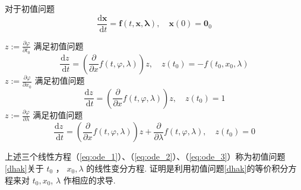 对于初值问题
\begin{equation}\label{dhak}
    \frac{\mathrm{d} \boldsymbol{x}}{\mathrm{~d} t}=\boldsymbol{f}(t, \boldsymbol{x}, \boldsymbol{\lambda}), \quad \boldsymbol{x}\left(0\right)=\boldsymbol{0}_0
\end{equation}
\begin{corollary}
    $z:=\frac{\partial \varphi}{\partial t_0}$ 满足初值问题
    \begin{equation}\label{eq:ode_1}
        \frac{\mathrm{d} z}{\mathrm{~d} t}=\left(\frac{\partial}{\partial x} f(t, \varphi, \lambda)\right) z, \quad z\left(t_0\right)=-f\left(t_0, x_0, \lambda\right)
    \end{equation}
    $z:=\frac{\partial \varphi}{\partial x_0}$ 满足初值问题
    \begin{equation}\label{eq:ode_2}
        \frac{\mathrm{d} z}{\mathrm{~d} t}=\left(\frac{\partial}{\partial x} f(t, \varphi, \lambda)\right) z, \quad z\left(t_0\right)=1
    \end{equation}
    $z:=\frac{\partial \varphi}{\partial \lambda}$ 满足初值问题
    \begin{equation}\label{eq:ode_3}
        \frac{\mathrm{d} z}{\mathrm{~d} t}=\left(\frac{\partial}{\partial x} f(t, \varphi, \lambda)\right) z+\frac{\partial}{\partial \lambda} f(t, \varphi, \lambda), \quad z\left(t_0\right)=0
    \end{equation}
\end{corollary}
\begin{note}
    上述三个线性方程（\ref{eq:ode_1}）、（\ref{eq:ode_2}）、（\ref{eq:ode_3}）称为初值问题\ref{dhak}关于 $t_0$ ， $x_0, \lambda$ 的线性变分方程. 证明是利用初值问题\ref{dhak}的等价积分方程来对 $t_0, x_0$, $\lambda$ 作相应的求导.
\end{note}

